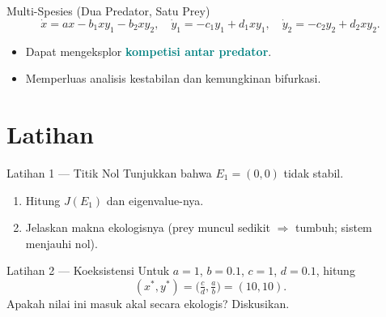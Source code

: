 \documentclass[aspectratio=32]{beamer}
\newcommand{\jsg}[1]{\textcolor{teal}{\textbf{#1}}}
\begin{document}
\begin{frame}{Multi-Spesies (Dua Predator, Satu Prey)}
  \small
  \[
  \dot{x}= ax - b_1 x y_1 - b_2 x y_2,\quad
  \dot{y}_1= -c_1 y_1 + d_1 x y_1,\quad
  \dot{y}_2= -c_2 y_2 + d_2 x y_2.
  \]
  \begin{itemize}
    \item Dapat mengeksplor \jsg{kompetisi antar predator}.
    \item Memperluas analisis kestabilan dan kemungkinan bifurkasi.
  \end{itemize}
\end{frame}

\section{Latihan}

\begin{frame}{Latihan 1 — Titik Nol}
  Tunjukkan bahwa \(E_1=(0,0)\) tidak stabil.
  \begin{enumerate}
    \item Hitung \(J(E_1)\) dan eigenvalue-nya.
    \item Jelaskan makna ekologisnya (prey muncul sedikit \(\Rightarrow\) tumbuh; sistem menjauhi nol).
  \end{enumerate}
\end{frame}

\begin{frame}{Latihan 2 — Koeksistensi}
  Untuk \(a=1\), \(b=0.1\), \(c=1\), \(d=0.1\), hitung
  \[
  (x^\ast,y^\ast)=\Big(\tfrac{c}{d},\tfrac{a}{b}\Big)= (10,10).
  \]
  Apakah nilai ini masuk akal secara ekologis? Diskusikan.
\end{frame}
\end{document}
